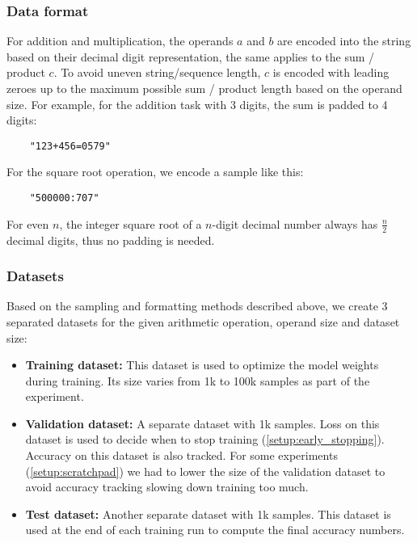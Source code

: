 \subsubsection{Data format}

For addition and multiplication, the operands $a$ and $b$ are encoded into the string based on their decimal digit representation, the same applies to the sum / product $c$. 
To avoid uneven string/sequence length, $c$ is encoded with leading zeroes up to the maximum possible sum / product length based on the operand size. For example, for the addition task with 3 digits, the sum is padded to 4 digits:

\begin{lstlisting}
	"123+456=0579"
\end{lstlisting}

For the square root operation, we encode a sample like this:

\begin{lstlisting}
	"500000:707"
\end{lstlisting}

For even $n$, the integer square root of a $n$-digit decimal number always has $\frac{n}{2}$ decimal digits, thus no padding is needed.

\subsubsection{Datasets}

Based on the sampling and formatting methods described above, we create 3 separated datasets for the given arithmetic operation, operand size and dataset size:

\begin{itemize}
	\item \textbf{Training dataset:} This dataset is used to optimize the model weights during training. Its size varies from 1k to 100k samples as part of the experiment.
	\item \textbf{Validation dataset:} A separate dataset with 1k samples. Loss on this dataset is used to decide when to stop training (\cref{setup:early_stopping}). Accuracy on this dataset is also tracked.
	For some experiments (\cref{setup:scratchpad}) we had to lower the size of the validation dataset to avoid accuracy tracking slowing down training too much.
	\item \textbf{Test dataset:} Another separate dataset with 1k samples. This dataset is used at the end of each training run to compute the final accuracy numbers.
\end{itemize}

